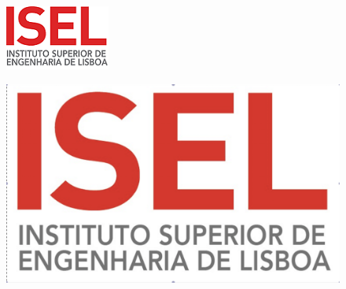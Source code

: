 \begin{figure}[!p]
    \centering
    \begin{minipage}[c][\textheight-1pt]{393pt}
        \vfill
	\begin{center}
        \includegraphics[scale=0.99,angle=90]{imgs/LOGO_principal}
	\end{center}
	\vfill
    \end{minipage}
    \hspace{2pt}
    \begin{minipage}[c][\textheight-1pt]{22.5pt}
    \end{minipage}
\end{figure}

\begin{figure}[!p]
    \centering
    \begin{minipage}[c][\textheight-1pt]{393pt}
        \vfill
	\begin{center}
        \includegraphics[scale=0.7,angle=90]{imgs/LOGO_principalGrande}
	\end{center}
	\vfill
    \end{minipage}
    \hspace{2pt}
    \begin{minipage}[c][\textheight-1pt]{22.5pt}
    \end{minipage}
\end{figure}
